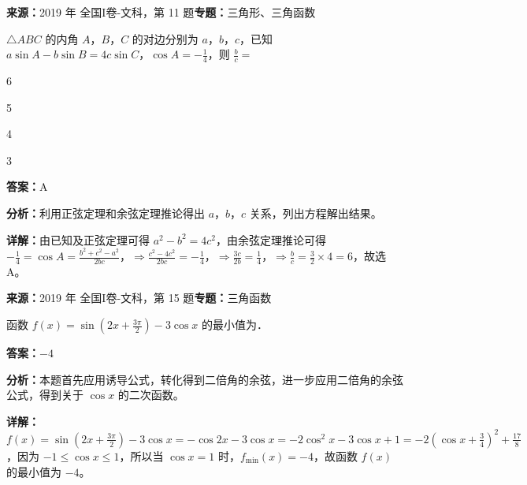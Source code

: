 \begin{question}[points=5]
\textbf{来源：}2019 年 全国I卷-文科，第 11 题\quad \textbf{专题：}三角形、三角函数\par
$\triangle ABC$ 的内角 $A$，$B$，$C$ 的对边分别为 $a$，$b$，$c$，已知 $a\sin A - b\sin B = 4c\sin C$，$\cos A = -\frac{1}{4}$，则 $\frac{b}{c} =$
\begin{choices}
  \item 6
  \item 5
  \item 4
  \item 3
\end{choices}
\begin{solution}
\textbf{答案：}A

\textbf{分析：}利用正弦定理和余弦定理推论得出 $a$，$b$，$c$ 关系，列出方程解出结果。

\textbf{详解：}由已知及正弦定理可得 $a^2 - b^2 = 4c^2$，由余弦定理推论可得 $-\frac{1}{4} = \cos A = \frac{b^2+c^2-a^2}{2bc}$，$\Rightarrow \frac{c^2-4c^2}{2bc} = -\frac{1}{4}$，$\Rightarrow \frac{3c}{2b} = \frac{1}{4}$，$\Rightarrow \frac{b}{c} = \frac{3}{2} \times 4 = 6$，故选 A。
\end{solution}
\end{question}

\begin{question}[points=5]
\textbf{来源：}2019 年 全国I卷-文科，第 15 题\quad \textbf{专题：}三角函数\par
函数 $f(x) = \sin(2x+\frac{3\pi}{2}) - 3\cos x$ 的最小值为．
\fillin[{$-4$}]
\begin{solution}
\textbf{答案：}$-4$

\textbf{分析：}本题首先应用诱导公式，转化得到二倍角的余弦，进一步应用二倍角的余弦公式，得到关于 $\cos x$ 的二次函数。

\textbf{详解：}$f(x) = \sin(2x+\frac{3\pi}{2}) - 3\cos x = -\cos 2x - 3\cos x = -2\cos^2 x - 3\cos x + 1 = -2(\cos x + \frac{3}{4})^2 + \frac{17}{8}$，因为 $-1 \le \cos x \le 1$，所以当 $\cos x = 1$ 时，$f_{\min}(x) = -4$，故函数 $f(x)$ 的最小值为 $-4$。
\end{solution}
\end{question}

